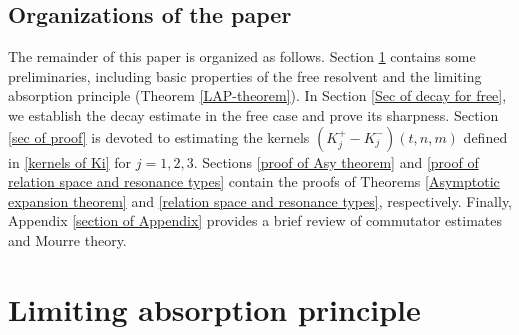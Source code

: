 \documentclass[reqno, 11pt]{amsart}
\numberwithin{equation}{section}
\begin{document}
\subsection{Organizations of the paper}
The remainder of this paper is organized as follows. Section \ref{sec of LAP} contains some preliminaries, including basic properties of the free resolvent and the limiting absorption principle (Theorem \ref{LAP-theorem}). In Section \ref{Sec of decay for free}, we establish the decay estimate in the free case and prove its sharpness. Section \ref{sec of proof} is devoted to estimating the kernels $(K_j^+-K_j^-)(t,n,m)$ defined in \eqref{kernels of Ki} for $j=1,2,3$. Sections \ref{proof of Asy theorem} and \ref{proof of relation space and resonance types} contain the proofs of Theorems \ref{Asymptotic expansion theorem} and \ref{relation space and resonance types}, respectively. Finally, Appendix \ref{section of Appendix} provides a brief review of commutator estimates and Mourre theory.
\section{Limiting absorption principle}\label{sec of LAP}
\end{document}

